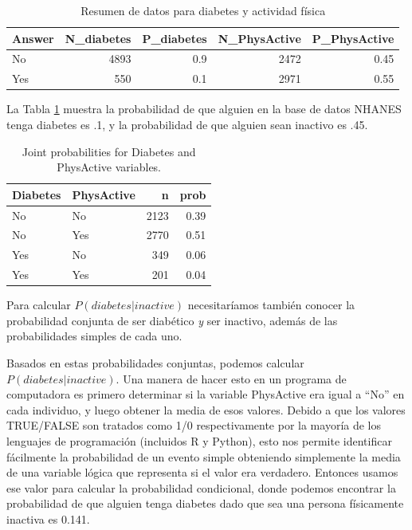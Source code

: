 \documentclass[
  12pt,
]{book}
\begin{document}
\begin{table}

\caption{\label{tab:DiabetesPhysActiveSummary}Resumen de datos para diabetes y actividad física}
\centering
\begin{tabular}[t]{l|r|r|r|r}
\hline
Answer & N\_diabetes & P\_diabetes & N\_PhysActive & P\_PhysActive\\
\hline
No & 4893 & 0.9 & 2472 & 0.45\\
\hline
Yes & 550 & 0.1 & 2971 & 0.55\\
\hline
\end{tabular}
\end{table}

La Tabla \ref{tab:DiabetesPhysActiveSummary} muestra la probabilidad de que alguien en la base de datos NHANES tenga diabetes es .1, y la probabilidad de que alguien sean inactivo es .45.

\begin{table}

\caption{\label{tab:DiabetesPhysActiveSummaryJoint}Joint probabilities for Diabetes and PhysActive variables.}
\centering
\begin{tabular}[t]{l|l|r|r}
\hline
Diabetes & PhysActive & n & prob\\
\hline
No & No & 2123 & 0.39\\
\hline
No & Yes & 2770 & 0.51\\
\hline
Yes & No & 349 & 0.06\\
\hline
Yes & Yes & 201 & 0.04\\
\hline
\end{tabular}
\end{table}

Para calcular \(P(diabetes|inactive)\) necesitaríamos también conocer la probabilidad conjunta de ser diabético \emph{y} ser inactivo, además de las probabilidades simples de cada uno.

Basados en estas probabilidades conjuntas, podemos calcular \(P(diabetes|inactive)\). Una manera de hacer esto en un programa de computadora es primero determinar si la variable PhysActive era igual a ``No'' en cada individuo, y luego obtener la media de esos valores. Debido a que los valores TRUE/FALSE son tratados como 1/0 respectivamente por la mayoría de los lenguajes de programación (incluidos R y Python), esto nos permite identificar fácilmente la probabilidad de un evento simple obteniendo simplemente la media de una variable lógica que representa si el valor era verdadero. Entonces usamos ese valor para calcular la probabilidad condicional, donde podemos encontrar la probabilidad de que alguien tenga diabetes dado que sea una persona físicamente inactiva es 0.141.
\end{document}
